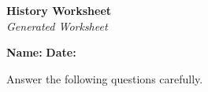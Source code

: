 \documentclass{article}
\begin{document}
\begin{center}
    \Huge \textbf{ History Worksheet } \\[0.5cm]
    \large \textit{Generated Worksheet}
\end{center}

\vspace{1cm}

\noindent \textbf{Name:} \underline{\hspace{6cm}} \hfill \textbf{Date:} \underline{\hspace{4cm}}

\vspace{1cm}

Answer the following questions carefully.

\vspace{0.5cm}

\begin{enumerate}

\end{enumerate}
\end{document}
